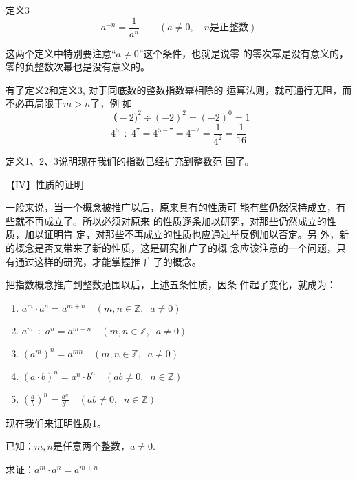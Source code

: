\begin{blk}{定义3}
    \[a^{-n}=\frac{1}{a^n} \qquad  (a\ne 0, \quad n\text{是正整数})\]
\end{blk}

这两个定义中特别要注意“$a\ne 0$”这个条件，也就是说零
的零次幂是没有意义的，零的负整数次幂也是没有意义的。

有了定义2和定义3, 对于同底数的整数指数幂相除的
运算法则，就可通行无阻，而不必再局限于$m>n$了，例
如
\[（-2)^2\div (-2)^2=(-2)^0=1\]
\[4^5\div 4^7=4^{5-7}=4^{-2}=\frac{1}{4^2}=\frac{1}{16}\]

定义1、2、3说明现在我们的指数已经扩充到整数范
围了。

【IV】性质的证明

一般来说，当一个概念被推广以后，原来具有的性质可
能有些仍然保持成立，有些就不再成立了。所以必须对原来
的性质逐条加以研究，对那些仍然成立的性质，加以证明肯
定，对那些不再成立的性质也应通过举反例加以否定。另
外，新的概念是否又带来了新的性质，这是研究推广了的概
念应该注意的一个问题，只有通过这样的研究，才能掌握推
广了的概念。

把指数概念推广到整数范围以后，上述五条性质，因条
件起了变化，就成为：

\begin{blk}{}
\begin{enumerate}
    \item $a^m\cdot a^n=a^{m+n}\quad (m,n\in\mathbb{Z},\;\; a\ne 0)$
    \item $a^m\div a^n=a^{m-n}\quad (m,n\in\mathbb{Z},\;\; a\ne 0)$
    \item $(a^m)^n=a^{mn}\quad (m,n\in\mathbb{Z},\;\; a\ne 0)$
    \item $(a\cdot b)^n=a^{n}\cdot b^n\quad (ab\ne 0,\;\; n\in\mathbb{Z})$
    \item $\left(\frac{a}{b}\right)^n=\frac{a^n}{b^n}\quad (ab\ne 0,\;\; n\in\mathbb{Z})$
\end{enumerate}    
\end{blk}

现在我们来证明性质1。

已知：$m,n$是任意两个整数，$a\ne 0$.

求证：$a^m\cdot a^n=a^{m+n}$

